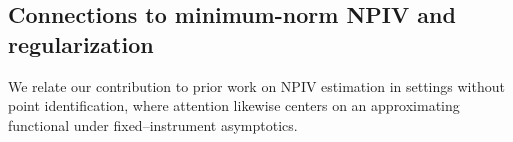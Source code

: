 \documentclass[11pt]{article}
\theoremstyle{plain}
\theoremstyle{definition}
\theoremstyle{remark}
\theoremstyle{definition}
\begin{document}

\subsection{Connections to minimum-norm NPIV and regularization}

We relate our contribution to prior work on NPIV estimation in settings without
point identification, where attention likewise centers on an approximating
functional under fixed--instrument asymptotics.  
\end{document}
